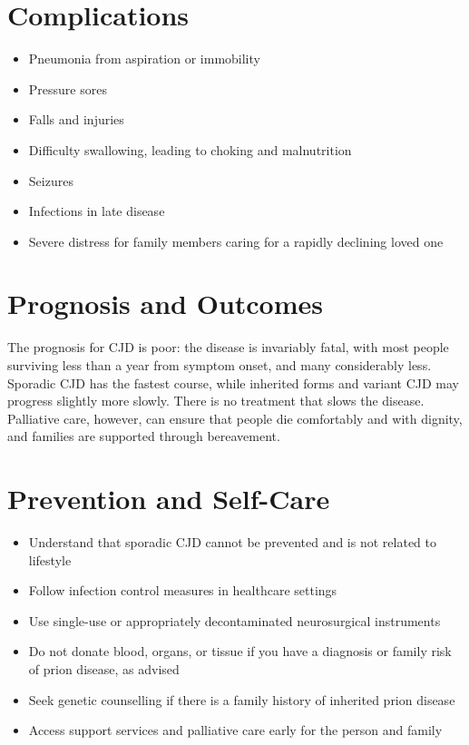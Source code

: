 \section*{Complications}
\begin{itemize}
    \item Pneumonia from aspiration or immobility
    \item Pressure sores
    \item Falls and injuries
    \item Difficulty swallowing, leading to choking and malnutrition
    \item Seizures
    \item Infections in late disease
    \item Severe distress for family members caring for a rapidly declining loved one
\end{itemize}

\section*{Prognosis and Outcomes}
The prognosis for CJD is poor: the disease is invariably fatal, with most people surviving less than a year from symptom onset, and many considerably less. Sporadic CJD has the fastest course, while inherited forms and variant CJD may progress slightly more slowly. There is no treatment that slows the disease. Palliative care, however, can ensure that people die comfortably and with dignity, and families are supported through bereavement.

\section*{Prevention and Self-Care}
\begin{itemize}
    \item Understand that sporadic CJD cannot be prevented and is not related to lifestyle
    \item Follow infection control measures in healthcare settings
    \item Use single-use or appropriately decontaminated neurosurgical instruments
    \item Do not donate blood, organs, or tissue if you have a diagnosis or family risk of prion disease, as advised
    \item Seek genetic counselling if there is a family history of inherited prion disease
    \item Access support services and palliative care early for the person and family
\end{itemize}

